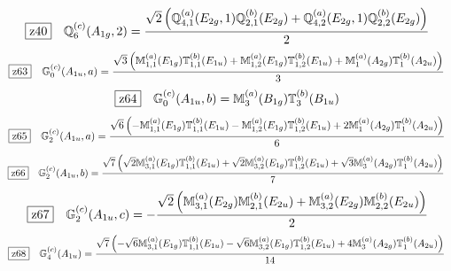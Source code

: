 \documentclass[fleqn,10pt,landscape]{jsarticle}
\begin{document}
\begin{dmath*}
\hspace*{3mm}\fbox{z40}\quad \mathbb{Q}_{6}^{(c)}(A_{1g},2)=\frac{\sqrt{2} \left(\mathbb{Q}_{4,1}^{(a)}(E_{2g},1) \mathbb{Q}_{2,1}^{(b)}(E_{2g}) + \mathbb{Q}_{4,2}^{(a)}(E_{2g},1) \mathbb{Q}_{2,2}^{(b)}(E_{2g})\right)}{2}
\end{dmath*}
\begin{dmath*}
\hspace*{3mm}\fbox{z63}\quad \mathbb{G}_{0}^{(c)}(A_{1u},a)=\frac{\sqrt{3} \left(\mathbb{M}_{1,1}^{(a)}(E_{1g}) \mathbb{T}_{1,1}^{(b)}(E_{1u}) + \mathbb{M}_{1,2}^{(a)}(E_{1g}) \mathbb{T}_{1,2}^{(b)}(E_{1u}) + \mathbb{M}_{1}^{(a)}(A_{2g}) \mathbb{T}_{1}^{(b)}(A_{2u})\right)}{3}
\end{dmath*}
\begin{dmath*}
\hspace*{3mm}\fbox{z64}\quad \mathbb{G}_{0}^{(c)}(A_{1u},b)=\mathbb{M}_{3}^{(a)}(B_{1g}) \mathbb{T}_{3}^{(b)}(B_{1u})
\end{dmath*}
\begin{dmath*}
\hspace*{3mm}\fbox{z65}\quad \mathbb{G}_{2}^{(c)}(A_{1u},a)=\frac{\sqrt{6} \left(- \mathbb{M}_{1,1}^{(a)}(E_{1g}) \mathbb{T}_{1,1}^{(b)}(E_{1u}) - \mathbb{M}_{1,2}^{(a)}(E_{1g}) \mathbb{T}_{1,2}^{(b)}(E_{1u}) + 2 \mathbb{M}_{1}^{(a)}(A_{2g}) \mathbb{T}_{1}^{(b)}(A_{2u})\right)}{6}
\end{dmath*}
\begin{dmath*}
\hspace*{3mm}\fbox{z66}\quad \mathbb{G}_{2}^{(c)}(A_{1u},b)=\frac{\sqrt{7} \left(\sqrt{2} \mathbb{M}_{3,1}^{(a)}(E_{1g}) \mathbb{T}_{1,1}^{(b)}(E_{1u}) + \sqrt{2} \mathbb{M}_{3,2}^{(a)}(E_{1g}) \mathbb{T}_{1,2}^{(b)}(E_{1u}) + \sqrt{3} \mathbb{M}_{3}^{(a)}(A_{2g}) \mathbb{T}_{1}^{(b)}(A_{2u})\right)}{7}
\end{dmath*}
\begin{dmath*}
\hspace*{3mm}\fbox{z67}\quad \mathbb{G}_{2}^{(c)}(A_{1u},c)=- \frac{\sqrt{2} \left(\mathbb{M}_{3,1}^{(a)}(E_{2g}) \mathbb{M}_{2,1}^{(b)}(E_{2u}) + \mathbb{M}_{3,2}^{(a)}(E_{2g}) \mathbb{M}_{2,2}^{(b)}(E_{2u})\right)}{2}
\end{dmath*}
\begin{dmath*}
\hspace*{3mm}\fbox{z68}\quad \mathbb{G}_{4}^{(c)}(A_{1u})=\frac{\sqrt{7} \left(- \sqrt{6} \mathbb{M}_{3,1}^{(a)}(E_{1g}) \mathbb{T}_{1,1}^{(b)}(E_{1u}) - \sqrt{6} \mathbb{M}_{3,2}^{(a)}(E_{1g}) \mathbb{T}_{1,2}^{(b)}(E_{1u}) + 4 \mathbb{M}_{3}^{(a)}(A_{2g}) \mathbb{T}_{1}^{(b)}(A_{2u})\right)}{14}
\end{dmath*}
\end{document}
